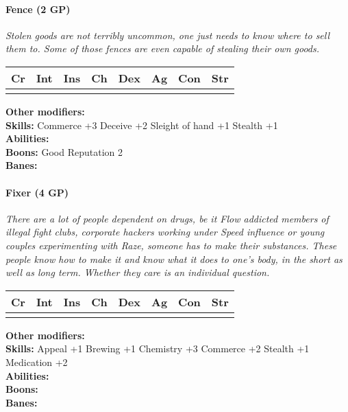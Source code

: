 \documentclass[12pt,a4paper,openany]{book}
\begin{document}
	\paragraph*{Fence (2 GP)}
	\textit{Stolen goods are not terribly uncommon, one just needs to know where to sell them to. Some of those fences are even capable of stealing their own goods.}\par
	\begin{tabular}{|l|l|l|l|l|l|l|l|}
		\hline
		Cr & Int & Ins & Ch & Dex & Ag & Con & Str \\ \hline
		&  &  &  &  &  &  &  \\ \hline
	\end{tabular}\par
	\noindent\textbf{Other modifiers:} \\
	\textbf{Skills:} Commerce +3
	Deceive +2
	Sleight of hand +1
	Stealth +1\\
	\textbf{Abilities:} \\
	\textbf{Boons:} Good Reputation 2\\
	\textbf{Banes:} \\
	
	\hrulefill
	\paragraph*{Fixer (4 GP)}
	\textit{There are a lot of people dependent on drugs, be it Flow addicted members of illegal fight clubs, corporate hackers working under Speed influence or young couples experimenting with Raze, someone has to make their substances. These people know how to make it and know what it does to one's body, in the short as well as long term. Whether they care is an individual question.}\par
	\begin{tabular}{|l|l|l|l|l|l|l|l|}
		\hline
		Cr & Int & Ins & Ch & Dex & Ag & Con & Str \\ \hline
		&  &  &  &  &  &  &  \\ \hline
	\end{tabular}\par
	\noindent\textbf{Other modifiers:} \\
	\textbf{Skills:} Appeal +1
	Brewing +1
	Chemistry +3
	Commerce +2
	Stealth +1
	Medication +2\\
	\textbf{Abilities:} \\
	\textbf{Boons:} \\
	\textbf{Banes:} \\
	
\end{document}
